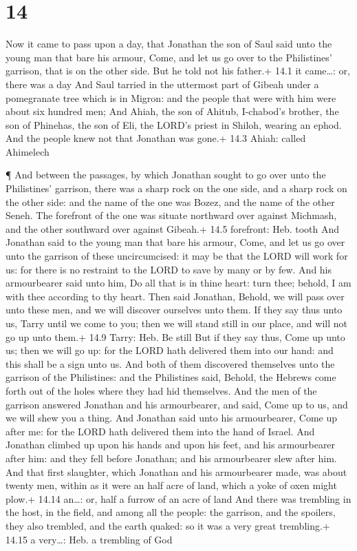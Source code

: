 \hypertarget{section-13}{%
\section{14}\label{section-13}}

 Now it came to pass upon a day, that Jonathan the son of
Saul said unto the young man that bare his armour, Come, and let us go
over to the Philistines' garrison, that is on the other side. But he
told not his father.+ 14.1 it came\ldots: or, there was a day
 And Saul tarried in the uttermost part of Gibeah under a
pomegranate tree which is in Migron: and the people that were with him
were about six hundred men;  And Ahiah, the son of Ahitub,
I-chabod's brother, the son of Phinehas, the son of Eli, the LORD's
priest in Shiloh, wearing an ephod. And the people knew not that
Jonathan was gone.+ 14.3 Ahiah: called Ahimelech

 ¶ And between the passages, by which Jonathan sought to go
over unto the Philistines' garrison, there was a sharp rock on the one
side, and a sharp rock on the other side: and the name of the one was
Bozez, and the name of the other Seneh.  The forefront of
the one was situate northward over against Michmash, and the other
southward over against Gibeah.+ 14.5 forefront: Heb. tooth 
And Jonathan said to the young man that bare his armour, Come, and let
us go over unto the garrison of these uncircumcised: it may be that the
LORD will work for us: for there is no restraint to the LORD to save by
many or by few.  And his armourbearer said unto him, Do all
that is in thine heart: turn thee; behold, I am with thee according to
thy heart.  Then said Jonathan, Behold, we will pass over
unto these men, and we will discover ourselves unto them. 
If they say thus unto us, Tarry until we come to you; then we will stand
still in our place, and will not go up unto them.+ 14.9 Tarry: Heb. Be
still  But if they say thus, Come up unto us; then we will
go up: for the LORD hath delivered them into our hand: and this shall be
a sign unto us.  And both of them discovered themselves
unto the garrison of the Philistines: and the Philistines said, Behold,
the Hebrews come forth out of the holes where they had hid themselves.
 And the men of the garrison answered Jonathan and his
armourbearer, and said, Come up to us, and we will shew you a thing. And
Jonathan said unto his armourbearer, Come up after me: for the LORD hath
delivered them into the hand of Israel.  And Jonathan
climbed up upon his hands and upon his feet, and his armourbearer after
him: and they fell before Jonathan; and his armourbearer slew after him.
 And that first slaughter, which Jonathan and his
armourbearer made, was about twenty men, within as it were an half acre
of land, which a yoke of oxen might plow.+ 14.14 an\ldots: or, half a
furrow of an acre of land  And there was trembling in the
host, in the field, and among all the people: the garrison, and the
spoilers, they also trembled, and the earth quaked: so it was a very
great trembling.+ 14.15 a very\ldots: Heb. a trembling of God

